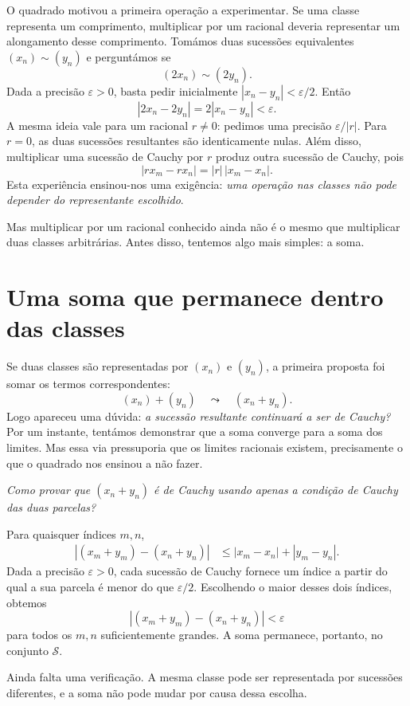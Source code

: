 \documentclass[11pt,a4paper]{article}
\newcommand{\questao}[1]{\par\medskip\noindent\textit{#1}\par\smallskip}
\begin{document}
O quadrado motivou a primeira operação a experimentar. Se uma classe representa um comprimento, multiplicar por um racional deveria representar um alongamento desse comprimento. Tomámos duas sucessões equivalentes $(x_n)\sim(y_n)$ e perguntámos se
\[
 (2x_n)\sim(2y_n).
\]
Dada a precisão $\varepsilon>0$, basta pedir inicialmente $|x_n-y_n|<\varepsilon/2$. Então
\[
 |2x_n-2y_n|=2|x_n-y_n|<\varepsilon.
\]
A mesma ideia vale para um racional $r\ne0$: pedimos uma precisão $\varepsilon/|r|$. Para $r=0$, as duas sucessões resultantes são identicamente nulas. Além disso, multiplicar uma sucessão de Cauchy por $r$ produz outra sucessão de Cauchy, pois
\[
 |rx_m-rx_n|=|r|\,|x_m-x_n|.
\]
Esta experiência ensinou-nos uma exigência: \emph{uma operação nas classes não pode depender do representante escolhido}.

Mas multiplicar por um racional conhecido ainda não é o mesmo que multiplicar duas classes arbitrárias. Antes disso, tentemos algo mais simples: a soma.

\section{Uma soma que permanece dentro das classes}

Se duas classes são representadas por $(x_n)$ e $(y_n)$, a primeira proposta foi somar os termos correspondentes:
\[
 (x_n)+(y_n)\quad\leadsto\quad(x_n+y_n).
\]
Logo apareceu uma dúvida: \emph{a sucessão resultante continuará a ser de Cauchy?} Por um instante, tentámos demonstrar que a soma converge para a soma dos limites. Mas essa via pressuporia que os limites racionais existem, precisamente o que o quadrado nos ensinou a não fazer.

\questao{Como provar que $(x_n+y_n)$ é de Cauchy usando apenas a condição de Cauchy das duas parcelas?}

Para quaisquer índices $m,n$,
\[
 \begin{aligned}
 |(x_m+y_m)-(x_n+y_n)|
 &\le |x_m-x_n|+|y_m-y_n|.
 \end{aligned}
\]
Dada a precisão $\varepsilon>0$, cada sucessão de Cauchy fornece um índice a partir do qual a sua parcela é menor do que $\varepsilon/2$. Escolhendo o maior desses dois índices, obtemos
\[
 |(x_m+y_m)-(x_n+y_n)|<\varepsilon
\]
para todos os $m,n$ suficientemente grandes. A soma permanece, portanto, no conjunto $\mathcal S$.

Ainda falta uma verificação. A mesma classe pode ser representada por sucessões diferentes, e a soma não pode mudar por causa dessa escolha.
\end{document}
